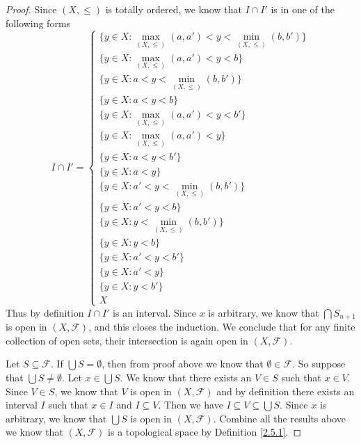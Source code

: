 \begin{proof}
    Since \((X, \leq)\) is totally ordered, we know that \(I \cap I'\) is in one of the following forms
    \[
        I \cap I' = \begin{cases}
            \{y \in X : \max_{(X, \leq)}(a, a') < y < \min_{(X, \leq)}(b, b')\} \\
            \{y \in X : \max_{(X, \leq)}(a, a') < y < b\}                       \\
            \{y \in X : a < y < \min_{(X, \leq)}(b, b')\}                       \\
            \{y \in X : a < y < b\}                                             \\
            \{y \in X : \max_{(X, \leq)}(a, a') < y < b'\}                      \\
            \{y \in X : \max_{(X, \leq)}(a, a') < y\}                           \\
            \{y \in X : a < y < b'\}                                            \\
            \{y \in X : a < y\}                                                 \\
            \{y \in X : a' < y < \min_{(X, \leq)}(b, b')\}                      \\
            \{y \in X : a' < y < b\}                                            \\
            \{y \in X : y < \min_{(X, \leq)}(b, b')\}                           \\
            \{y \in X : y < b\}                                                 \\
            \{y \in X : a' < y < b'\}                                           \\
            \{y \in X : a' < y\}                                                \\
            \{y \in X : y < b'\}                                                \\
            X
        \end{cases}
    \]
    Thus by definition \(I \cap I'\) is an interval.
    Since \(x\) is arbitrary, we know that \(\bigcap S_{n + 1}\) is open in \((X, \mathcal{F})\), and this closes the induction.
    We conclude that for any finite collection of open sets, their intersection is again open in \((X, \mathcal{F})\).

    Let \(S \subseteq \mathcal{F}\).
    If \(\bigcup S = \emptyset\), then from proof above we know that \(\emptyset \in \mathcal{F}\).
    So suppose that \(\bigcup S \neq \emptyset\).
    Let \(x \in \bigcup S\).
    We know that there exists an \(V \in S\) such that \(x \in V\).
    Since \(V \in S\), we know that \(V\) is open in \((X, \mathcal{F})\) and by definition there exists an interval \(I\) such that \(x \in I\) and \(I \subseteq V\).
    Then we have \(I \subseteq V \subseteq \bigcup S\).
    Since \(x\) is arbitrary, we know that \(\bigcup S\) is open in \((X, \mathcal{F})\).
    Combine all the results above we know that \((X, \mathcal{F})\) is a topological space by Definition \ref{2.5.1}.


\end{proof}
